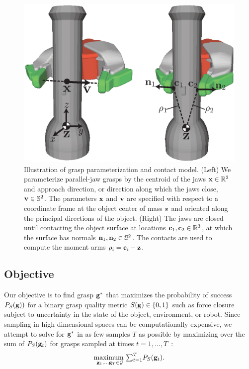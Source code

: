 \begin{figure}[t!]
\centering
\includegraphics[scale=0.44]{figures/illustrations/dexnet_grasping_model.eps}
\caption{Illustration of grasp parameterization and contact model. (Left) We parameterize parallel-jaw grasps by the centroid of the jaws $\mathbf{x} \in \mathbb{R}^3$ and approach direction, or direction along which the jaws close, $\mathbf{v} \in \mathbb{S}^2$. The parameters $\mathbf{x}$ and $\mathbf{v}$ are specified with respect to a coordinate frame at the object center of mass $\mathbf{z}$ and oriented along the principal directions of the object. (Right) The jaws are closed until contacting the object surface at locations $\mathbf{c}_1, \mathbf{c}_2 \in \mathbb{R}^3$, at which the surface has normals $\mathbf{n}_1, \mathbf{n}_2 \in \mathbb{S}^2$. The contacts are used to compute the moment arms $\rho_i = \mathbf{c}_i - \mathbf{z}$.
}
\vspace*{-15pt}
\end{figure}

\subsection{Objective}
Our objective is to find grasp $\mathbf{g}^*$ that maximizes the probability of success $P_S(\mathbf{g}))$ for a binary grasp quality metric $S(\mathbf{g}) \in \{0, 1\}$ such as force closure~\cite{kim2012physically, laskey2015bandits, mahler2015gp, weisz2012pose} subject to uncertainty in the state of the object, environment, or robot.
Since sampling in high-dimensional spaces can be computationally expensive, we attempt to solve for $\mathbf{g}^*$ in as few samples $T$ as possible by maximizing over the sum of $P_S(\mathbf{g}_t)$ for grasps sampled at times $t=1, ..., T$~\cite{laskey2015bandits, srinivas10gaussian}:
\begin{align*}
	\underset{\mathbf{g}_1, .., \mathbf{g}_T \in \mathcal{G}}{\text{maximum }} {\textstyle \sum_{t=1}^T \nolimits } P_S(\mathbf{g}_t). \label{eq:obj}
\end{align*}

